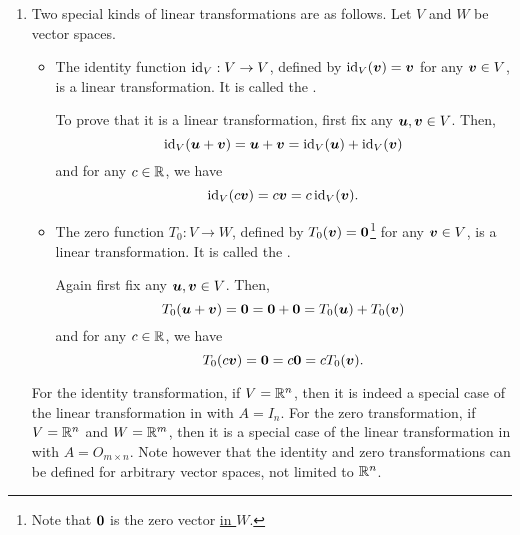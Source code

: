 \begin{enumerate}
\item Two special kinds of linear transformations are as follows. Let \(V\) and
\(W\) be vector spaces.
\begin{itemize}
\item The identity function \(\operatorname{id}_{V}:V\to V\), defined by
\(\operatorname{id}_{V}(\vb*{v})=\vb*{v}\) for any \(\vb*{v}\in V\), is a linear
transformation. It is called the .

\begin{pf}
To prove that it is a linear transformation, first fix any
\(\vb*{u},\vb*{v}\in V\). Then,
\[
\operatorname{id}_{V}(\vb*{u}+\vb*{v})=\vb*{u}+\vb*{v}=\operatorname{id}_{V}(\vb*{u})+\operatorname{id}_{V}(\vb*{v})
\]
and for any \(c\in\mathbb{R}\), we have
\[
\operatorname{id}_{V}(c\vb*{v})=c\vb*{v}=c\operatorname{id}_{V}(\vb*{v}).
\]
\end{pf}

\item The zero function \(T_0:V\to W\), defined by
\(T_0(\vb*{v})=\vb*{0}\)\footnote{Note that \(\vb*{0}\) is the zero vector
\underline{in \(W\)}.} for any \(\vb*{v}\in V\), is a linear
transformation. It is called the .

\begin{pf}
Again first fix any \(\vb*{u},\vb*{v}\in V\). Then,
\[
T_0(\vb*{u}+\vb*{v})=\vb*{0}=\vb*{0}+\vb*{0}=T_0(\vb*{u})+T_0(\vb*{v})
\]
and for any \(c\in\mathbb{R}\), we have
\[
T_0(c\vb*{v})=\vb*{0}=c\vb*{0}=cT_0(\vb*{v}).
\]
\end{pf}
\end{itemize}
For the identity transformation, if \(V=\mathbb{R}^n\), then it is indeed a special
case of the linear transformation in  with \(A=I_n\).
For the zero transformation, if \(V=\mathbb{R}^n\) and \(W=\mathbb{R}^m\), then it is a special
case of the linear transformation in  with
\(A=O_{m\times n}\). Note however that the identity and zero transformations
can be defined for arbitrary vector spaces, not limited to \(\mathbb{R}^n\).


\end{enumerate}
